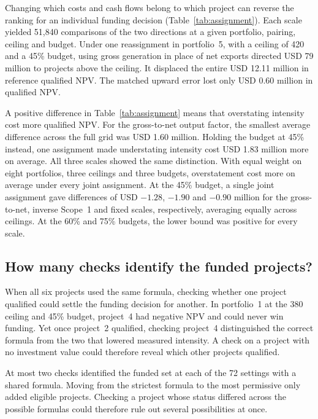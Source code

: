Changing which costs and cash flows belong to which project can reverse the ranking for an individual funding decision (Table~\ref{tab:assignment}). Each scale yielded 51,840 comparisons of the two directions at a given portfolio, pairing, ceiling and budget. Under one reassignment in portfolio~5, with a ceiling of 420 and a 45\% budget, using gross generation in place of net exports directed USD 79 million to projects above the ceiling. It displaced the entire USD 12.11 million in reference qualified NPV. The matched upward error lost only USD 0.60 million in qualified NPV.
\ifdefined\readingcopy\fi



A positive difference in Table~\ref{tab:assignment} means that overstating intensity cost more qualified NPV. For the gross-to-net output factor, the smallest average difference across the full grid was USD 1.60 million. Holding the budget at 45\% instead, one assignment made understating intensity cost USD 1.83 million more on average. All three scales showed the same distinction. With equal weight on eight portfolios, three ceilings and three budgets, overstatement cost more on average under every joint assignment. At the 45\% budget, a single joint assignment gave differences of USD $-1.28$, $-1.90$ and $-0.90$ million for the gross-to-net, inverse Scope~1 and fixed scales, respectively, averaging equally across ceilings. At the 60\% and 75\% budgets, the lower bound was positive for every scale.

\subsection{How many checks identify the funded projects?}
When all six projects used the same formula, checking whether one project qualified could settle the funding decision for another. In portfolio~1 at the 380 ceiling and 45\% budget, project~4 had negative NPV and could never win funding. Yet once project~2 qualified, checking project~4 distinguished the correct formula from the two that lowered measured intensity. A check on a project with no investment value could therefore reveal which other projects qualified.

At most two checks identified the funded set at each of the 72 settings with a shared formula. Moving from the strictest formula to the most permissive only added eligible projects. Checking a project whose status differed across the possible formulas could therefore rule out several possibilities at once.

